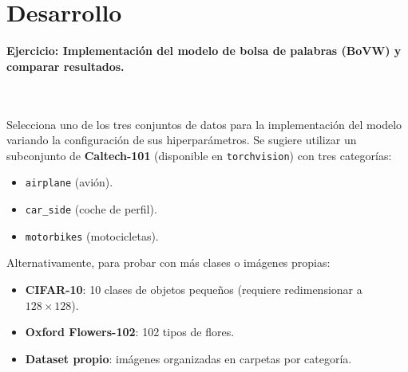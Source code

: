 \documentclass{article}
\begin{document}
\section{Desarrollo}
\begin{large}
\textbf{Ejercicio: Implementación del modelo de bolsa de palabras (BoVW) y comparar resultados.} 
\end{large}
\\\\
Selecciona uno de los tres conjuntos de datos para la implementación del modelo variando la configuración de sus hiperparámetros. Se sugiere utilizar un subconjunto de \textbf{Caltech-101} (disponible en \texttt{torchvision}) con tres categorías:
\begin{itemize}
    \item \texttt{airplane} (avión).
    \item \texttt{car\_side} (coche de perfil).
    \item \texttt{motorbikes} (motocicletas).
\end{itemize}
Alternativamente, para probar con más clases o imágenes propias:
\begin{itemize}
    \item \textbf{CIFAR-10}: 10 clases de objetos pequeños (requiere redimensionar a $128\times128$).
    \item \textbf{Oxford Flowers-102}: 102 tipos de flores.
    \item \textbf{Dataset propio}: imágenes organizadas en carpetas por categoría.
\end{itemize}
\\\\
\end{document}
